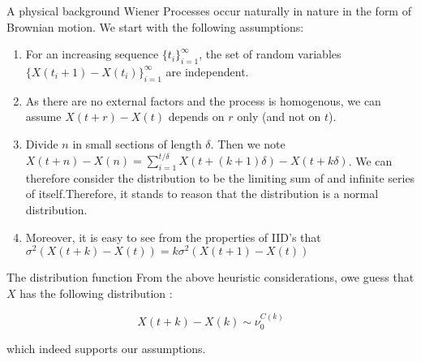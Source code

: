 \documentclass{beamer}
\begin{document}
\begin{frame}{A physical background}
    Wiener Processes occur naturally in nature in the form of Brownian motion. We start with the following assumptions:
    \begin{enumerate}
        \item For an increasing sequence $\{t_i\}_{i=1}^\infty$, the set of random variables $\{X(t_i+1)-X(t_i)\}_{i=1}^\infty$ are independent.\\\pause
        \item As there are no external factors and the process is homogenous, we can assume $X(t+r)-X(t)$ depends on $r$ only (and not on $t$).\pause
        \item Divide $n$ in small sections of length $\delta$. Then we note $X(t+n)-X(n)=\sum_{i=1}^{t/\delta}X(t+(k+1)\delta)-X(t+k\delta)$. We can therefore consider the distribution to be the limiting sum of and infinite series of itself.\pause Therefore, it stands to reason that the distribution is a normal distribution.\pause
        \item Moreover, it is easy to see from the properties of IID's that $\sigma^2(X(t+k)-X(t))=k\sigma^2(X(t+1)-X(t))$
    \end{enumerate}
\end{frame}
\begin{frame}{The distribution function}
    From the above heuristic considerations, owe guess that $X$ has the following distribution :
    \begin{tcolorbox}
        $$X(t+k)-X(k)\sim \nu_{0}^{C(k)}$$
    \end{tcolorbox}
    \hdots which indeed supports our assumptions.
\end{frame}
\end{document}
